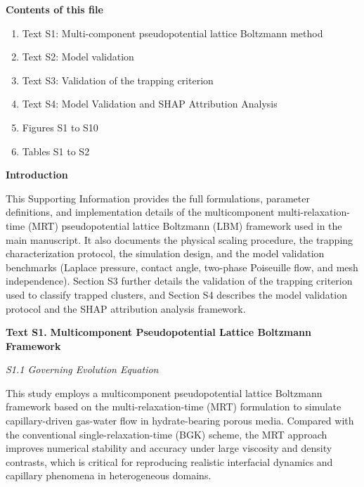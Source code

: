 \documentclass[draft,wrr]{agutexSI2019}
\begin{document}
\begin{article}

\noindent\textbf{Contents of this file}
\begin{enumerate}
  \item Text S1: Multi-component pseudopotential lattice Boltzmann method
  \item Text S2: Model validation
  \item Text S3: Validation of the trapping criterion
  \item Text S4: Model Validation and SHAP Attribution Analysis
  \item Figures S1 to S10
  \item Tables S1 to S2
\end{enumerate}


\noindent\textbf{Introduction}

This Supporting Information provides the full formulations, parameter
definitions, and implementation details of the multicomponent multi-relaxation-time
(MRT) pseudopotential lattice Boltzmann (LBM) framework used in the main
manuscript. It also documents the physical scaling procedure, the trapping
characterization protocol, the simulation design, and the model validation
benchmarks (Laplace pressure, contact angle, two-phase Poiseuille flow, and mesh
independence). Section S3 further details the validation of the trapping criterion
used to classify trapped clusters, and Section S4 describes the model validation
protocol and the SHAP attribution analysis framework.

\noindent\textbf{Text S1.}
\textbf{Multicomponent Pseudopotential Lattice Boltzmann Framework}

\noindent\textit{S1.1 Governing Evolution Equation}

This study employs a multicomponent pseudopotential lattice Boltzmann framework
based on the multi-relaxation-time (MRT) formulation to simulate capillary-driven
gas-water flow in hydrate-bearing porous media. Compared with the conventional
single-relaxation-time (BGK) scheme, the MRT approach improves numerical stability
and accuracy under large viscosity and density contrasts, which is critical for
reproducing realistic interfacial dynamics and capillary phenomena in heterogeneous
domains.


\end{article}
\end{document}
